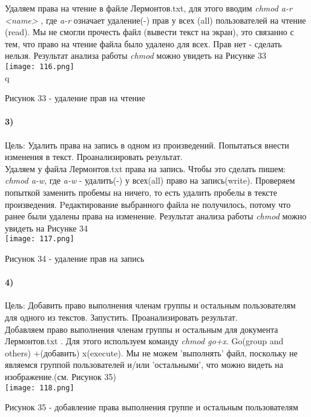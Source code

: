 		Удаляем права на чтение в файле Лермонтов.txt, для 			этого вводим \textit{chmod a-r <name> }, где \textit{a-r} означает удаление(-) 		прав у всех (all)  пользователей на чтение (read). Мы не смогли прочесть файл (вывести текст на экран), это связанно с тем, что право на чтение файла было удалено для всех. 
		Прав нет - сделать нельзя. Результат анализа работы \textit{chmod} можно увидеть на Рисунке 33\\
	\texttt{[image: 116.png]}\\q
		\centerline{Рисунок 33 - удаление прав на чтение}

		\paragraph{3)}
		Цель: Удалить права на запись в одном из произведений. Попытаться внести изменения в текст. Проанализировать результат.\\

		Удаляем у файла Лермонтов.txt права на запись. Чтобы это сделать пишем: 		\textit{chmod a-w}, где \textit{a-w} - удалить(-) у всех(all) право на 				запись(write). Проверяем попыткой заменить пробемы на ничего, то есть удалить 		пробелы в тексте произведения. Pедактирование выбранного файла не получилось, потому что ранее были удалены права на изменение. Результат анализа работы \textit{chmod} можно увидеть на Рисунке 34\\
	\texttt{[image: 117.png]}\\
		\centerline{Рисунок 34 - удаление прав на запись}

	
		\paragraph{4)}
		Цель: Добавить право выполнения членам группы и остальным пользователям для одного из текстов. Запустить. Проанализировать результат.\\

		Добавляем право выполнения членам группы и остальным  для документа 			Лермонтов.txt . Для этого используем команду \textit{chmod go+x}. Go(group and 		others) +(добавить) x(execute). Мы не можем 'выполнять' файл, поскольку не являемся группой пользователей и/или 'остальными', что можно видеть на изображение.(см. Рисунок 35) \\
	\texttt{[image: 118.png]}\\
		\centerline{Рисунок 35 - добавление права выполнения группе и остальным пользователям}

